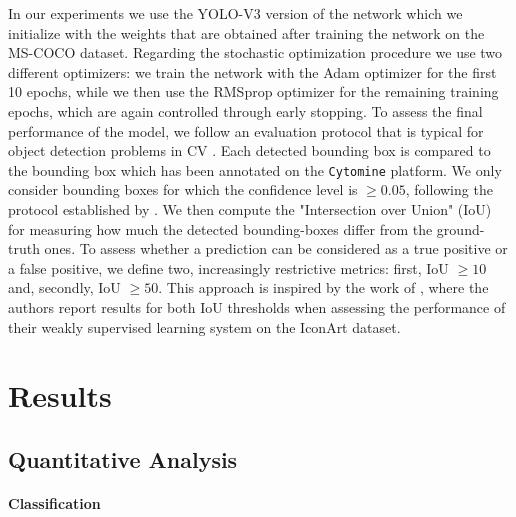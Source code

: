 In our experiments we use the YOLO-V3 version of the network which we initialize with the weights that are obtained after training the network on the MS-COCO dataset. Regarding the stochastic optimization procedure we use two different optimizers: we train the network with the Adam optimizer for the first 10 epochs, while we then use the RMSprop optimizer for the remaining training epochs, which are again controlled through early stopping. To assess the final performance of the model, we follow an evaluation protocol that is typical for object detection problems in CV \cite{lin2014microsoft}. Each detected bounding box is compared to the bounding box which has been annotated on the \texttt{Cytomine} platform. We only consider bounding boxes for which the confidence level is $\geq 0.05$, following the protocol established by \citet{everingham2010pascal}. We then compute the "Intersection over Union" (IoU) for measuring how much the detected bounding-boxes differ from the ground-truth ones. To assess whether a prediction can be considered as a true positive or a false positive, we define two, increasingly restrictive metrics: first, IoU $\geq10$ and, secondly, IoU $\geq50$. This approach is inspired by the work of \citet{gonthier2018weakly}, where the authors report results for both IoU thresholds when assessing the performance of their weakly supervised learning system on the IconArt dataset.

\section{Results}
\label{sec:results}

\subsection{Quantitative Analysis}
\label{sec:quantitative_analysis}
\paragraph{Classification}

